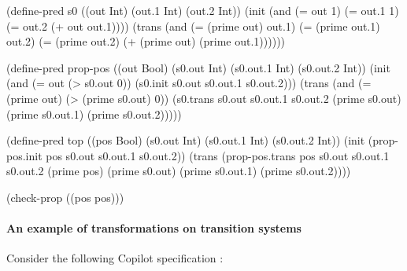 \begin{code}
(define-pred s0
  ((out Int)
   (out.1 Int)
   (out.2 Int))
  (init
    (and
      (= out 1)
      (= out.1 1)
      (= out.2
        (+ out out.1))))
  (trans
    (and
      (= (prime out) out.1)
      (= (prime out.1) out.2)
      (= (prime out.2)
        (+ (prime out) (prime out.1))))))

(define-pred prop-pos
  ((out Bool)
   (s0.out Int)
   (s0.out.1 Int)
   (s0.out.2 Int))
  (init
    (and
      (= out
        (> s0.out 0))
      (s0.init s0.out s0.out.1 s0.out.2)))
  (trans
    (and
      (= (prime out)
        (> (prime s0.out) 0))
      (s0.trans s0.out s0.out.1 s0.out.2 (prime s0.out) (prime s0.out.1) (prime s0.out.2)))))

(define-pred top
  ((pos Bool)
   (s0.out Int)
   (s0.out.1 Int)
   (s0.out.2 Int))
  (init
    (prop-pos.init pos s0.out s0.out.1 s0.out.2))
  (trans
    (prop-pos.trans pos s0.out s0.out.1 s0.out.2 (prime pos) (prime s0.out) (prime s0.out.1) (prime s0.out.2))))

(check-prop
  ((pos pos)))
\end{code}



\paragraph{An example of transformations on transition systems}


Consider the following Copilot specification : 

